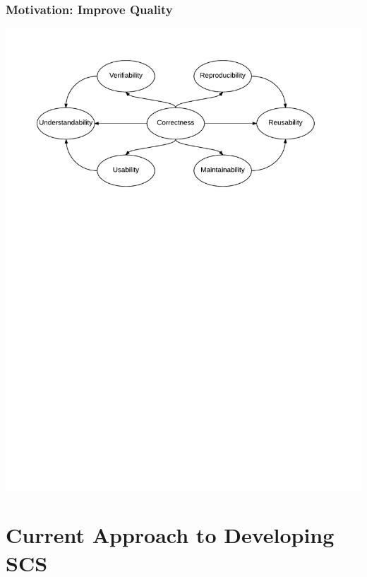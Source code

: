 \documentclass{beamer}
\begin{document}
\begin{frame}

\frametitle{Motivation: Improve Quality}

\includegraphics[width=1\textwidth]{RelationBWQualities.pdf}

\end{frame}


\section[Curr.\ Approach]{Current Approach to Developing SCS}

\end{document}
